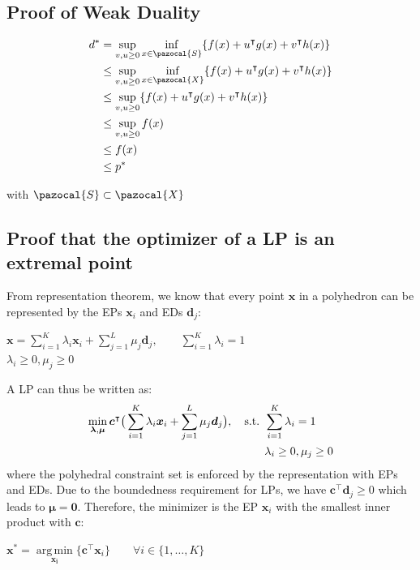 \documentclass[english]{latex4ei/latex4ei_sheet}
\DeclareMathOperator*{\argmin}{arg\,min}
\begin{document}
\begin{sectionbox}
	\subsection{Proof of Weak Duality}
	
	\begin{align}
		d^* & = \sup\limits_{v, u \geq 0} \inf\limits_{x \in \pazocal{S}} \{ f(x) + u^\intercal g(x) + v^\intercal h(x) \} \notag\\
		& \leq \sup\limits_{v, u \geq 0} \inf\limits_{x \in \pazocal{X}} \{ f(x) + u^\intercal g(x) + v^\intercal h(x) \} \notag\\
		& \leq \sup\limits_{v, u \geq 0} \{ f(x) + u^\intercal g(x) + v^\intercal h(x) \} \notag\\
		& \leq \sup\limits_{v, u \geq 0} f(x) \notag\\
		& \leq f(x) \notag\\
		& \leq p^* \notag
	\end{align}

	with $\pazocal{S} \subset \pazocal{X}$
	
\end{sectionbox}

\begin{sectionbox}
	\subsection{Proof that the optimizer of a LP is an extremal point}
	From representation theorem, we know that every point $\bm{x}$ in a polyhedron can be represented by the EPs $\bm{x}_i$ and EDs $\bm{d}_j$:
	\begin{center}
		$\bm{x} = \sum\limits_{i=1}^{K} \lambda_i\bm{x}_i + \sum\limits_{j=1}^{L}\mu_j\bm{d}_j, \qquad \sum\limits_{i=1}^{K}\lambda_i = 1$ \\
		$\lambda_i \geq 0, \mu_j \geq 0$ \\
	\end{center}
	A LP can thus be written as:
	\begin{align}
		\min\limits_{\bm{\lambda}, \bm{\mu}} \bm{c}^\intercal \big( \sum\limits_{i=1}^{K} \lambda_i\bm{x}_i + \sum\limits_{j=1}^{L}\mu_j\bm{d}_j \big), \quad \text{s.t. } & \sum\limits_{i=1}^{K}\lambda_i = 1 \notag\\
		& \lambda_i \geq 0, \mu_j \geq 0 \notag
	\end{align}
	where the polyhedral constraint set is enforced by the representation with EPs and EDs. Due to the boundedness requirement for LPs, we have $\bm{c}^\intercal\bm{d}_j \geq 0$ which leads to $\bm{\mu} = \bm{0}$. Therefore, the minimizer is the EP $\bm{x}_i$ with the smallest inner product with $\bm{c}$:
	\begin{center}
		$\bm{x}^* = \argmin\limits_{\bm{x_i}} \{ \bm{c}^\intercal\bm{x}_i \} \qquad \forall i \in \{1, \dots, K\}$
	\end{center}
\end{sectionbox}



\end{document}
